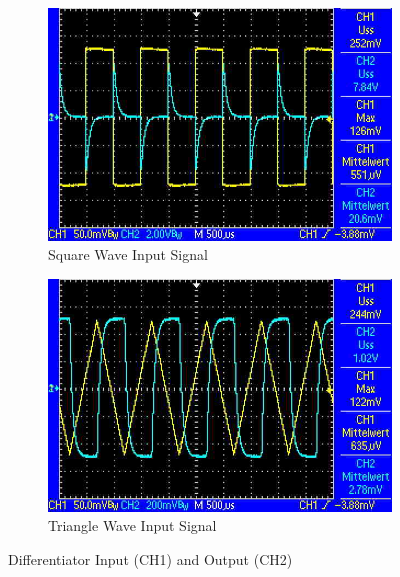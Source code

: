 \begin{figure}
	\centering
	\begin{subfigure}{0.4\textwidth}
		\centering
		\includegraphics[width=.9\linewidth]{./img/ss-diff-1.jpg}
		\caption{Square Wave Input Signal}
	\end{subfigure}
	\begin{subfigure}{0.4\textwidth}
		\centering
		\includegraphics[width=.9\linewidth]{./img/ss-diff-2.jpg}
		\caption{Triangle Wave Input Signal}
	\end{subfigure}
	\caption{Differentiator Input (CH1) and Output (CH2)}
	\label{ss:diff}
\end{figure}
